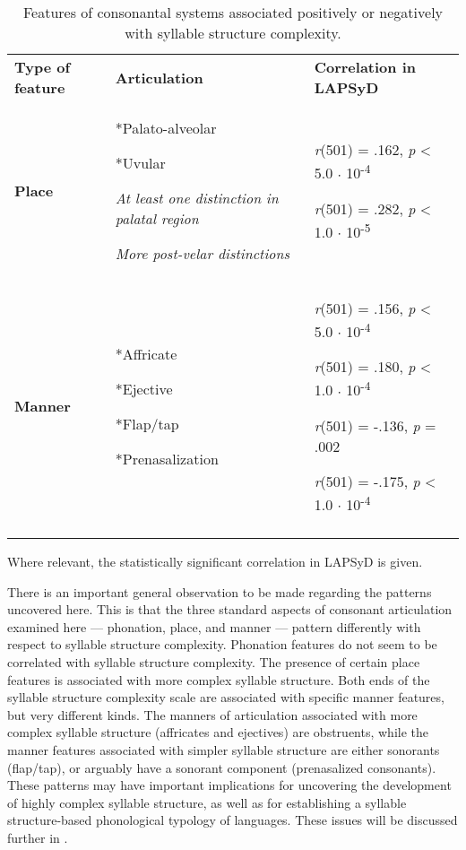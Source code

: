 \begin{table}
\begin{tabularx}{\textwidth}{XXX}
\lsptoprule

\textbf{Type of feature} & \textbf{Articulation} & \textbf{Correlation in LAPSyD}\\
\textbf{Place} & *Palato-alveolar

*Uvular

\textit{At least one distinction in palatal region}

\textit{More post-velar distinctions} & \textit{r}(501) = .162, \textit{p} < 5.0 \textsf{${\cdot}$} 10\textsuperscript{-4}

\textit{r}(501) = .282, \textit{p} < 1.0 \textsf{${\cdot}$} 10\textsuperscript{-5}\\
\textbf{Manner} & *Affricate

*Ejective

*Flap/tap

*Prenasalization & \textit{r}(501) = .156, \textit{p} < 5.0 \textsf{${\cdot}$} 10\textsuperscript{-4}

\textit{r}(501) = .180, \textit{p} < 1.0 \textsf{${\cdot}$} 10\textsuperscript{-4}

\textit{r}(501) = -.136, \textit{p} = .002

\textit{r}(501) = -.175, \textit{p} < 1.0 \textsf{${\cdot}$} 10\textsuperscript{-4}\\
\lspbottomrule
\end{tabularx}
\caption{\label{tab:4.15}Features of consonantal systems associated positively or negatively with syllable structure complexity.}Where relevant, the statistically significant correlation in LAPSyD \citep{MaddiesonEtAl2013} is given.
\end{table}

  There is an important general observation to be made regarding the patterns uncovered here. This is that the three standard aspects of consonant articulation examined here — phonation, place, and manner — pattern differently with respect to syllable structure complexity. Phonation features do not seem to be correlated with syllable structure complexity. The presence of certain place features is associated with more complex syllable structure. Both ends of the syllable structure complexity scale are associated with specific manner features, but very different kinds. The manners of articulation associated with more complex syllable structure (affricates and ejectives) are obstruents, while the manner features associated with simpler syllable structure are either sonorants (flap/tap), or arguably have a sonorant component (prenasalized consonants). These patterns may have important implications for uncovering the development of highly complex syllable structure, as well as for establishing a syllable structure-based phonological typology of languages. These issues will be discussed further in .

